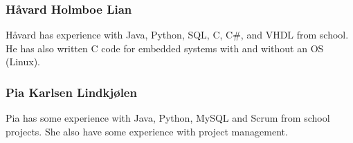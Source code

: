 \subsubsection{Håvard	Holmboe	Lian}
Håvard has experience with Java, Python, SQL, C, C\#, and VHDL from school. He has also written C code for embedded systems with and without an OS (Linux). 

\subsubsection{Pia	Karlsen	Lindkjølen}
Pia has some experience with Java, Python, MySQL and Scrum from school projects. She also have some experience with project management. 
